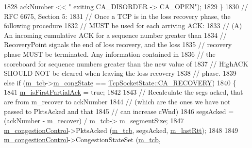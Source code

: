 \begin{DoxyCode}
1828                             ackNumber << \textcolor{stringliteral}{" exiting CA\_DISORDER -> CA\_OPEN"});
1829             \}
1830           \textcolor{comment}{// RFC 6675, Section 5:}
1831           \textcolor{comment}{// Once a TCP is in the loss recovery phase, the following procedure}
1832           \textcolor{comment}{// MUST be used for each arriving ACK:}
1833           \textcolor{comment}{// (A) An incoming cumulative ACK for a sequence number greater than}
1834           \textcolor{comment}{// RecoveryPoint signals the end of loss recovery, and the loss}
1835           \textcolor{comment}{// recovery phase MUST be terminated.  Any information contained in}
1836           \textcolor{comment}{// the scoreboard for sequence numbers greater than the new value of}
1837           \textcolor{comment}{// HighACK SHOULD NOT be cleared when leaving the loss recovery}
1838           \textcolor{comment}{// phase.}
1839           \textcolor{keywordflow}{else} \textcolor{keywordflow}{if} (\hyperlink{classns3_1_1TcpSocketBase_a26bbaf59001308dc43fb630d76f2e38b}{m\_tcb}->\hyperlink{classns3_1_1TcpSocketState_a4053e1eb120c572d0881b04620b52c30}{m\_congState} == 
      \hyperlink{classns3_1_1TcpSocketState_a6fc313945a33d48fd60cbffe0c787b19a092ee3d215c587170a751974dac5f663}{TcpSocketState::CA\_RECOVERY})
1840             \{
1841               \hyperlink{classns3_1_1TcpSocketBase_ad68f7d239e22043ba999101b94770d90}{m\_isFirstPartialAck} = \textcolor{keyword}{true};
1842 
1843               \textcolor{comment}{// Recalculate the segs acked, that are from m\_recover to ackNumber}
1844               \textcolor{comment}{// (which are the ones we have not passed to PktsAcked and that}
1845               \textcolor{comment}{// can increase cWnd)}
1846               segsAcked = (ackNumber - \hyperlink{classns3_1_1TcpSocketBase_a176f84edf4bba543e7e3457881f6660f}{m\_recover}) / \hyperlink{classns3_1_1TcpSocketBase_a26bbaf59001308dc43fb630d76f2e38b}{m\_tcb}->
      \hyperlink{classns3_1_1TcpSocketState_a079872f7b0099ef5f3cab4ff47bd2edd}{m\_segmentSize};
1847               \hyperlink{classns3_1_1TcpSocketBase_a090719d52b06a791341e2fefa5e12c3e}{m\_congestionControl}->PktsAcked (\hyperlink{classns3_1_1TcpSocketBase_a26bbaf59001308dc43fb630d76f2e38b}{m\_tcb}, segsAcked, 
      \hyperlink{classns3_1_1TcpSocketBase_a6c48fbea019c593b975bd1d5f5c95dde}{m\_lastRtt});
1848 
1849               \hyperlink{classns3_1_1TcpSocketBase_a090719d52b06a791341e2fefa5e12c3e}{m\_congestionControl}->CongestionStateSet (\hyperlink{classns3_1_1TcpSocketBase_a26bbaf59001308dc43fb630d76f2e38b}{m\_tcb}, 

\end{DoxyCode}

